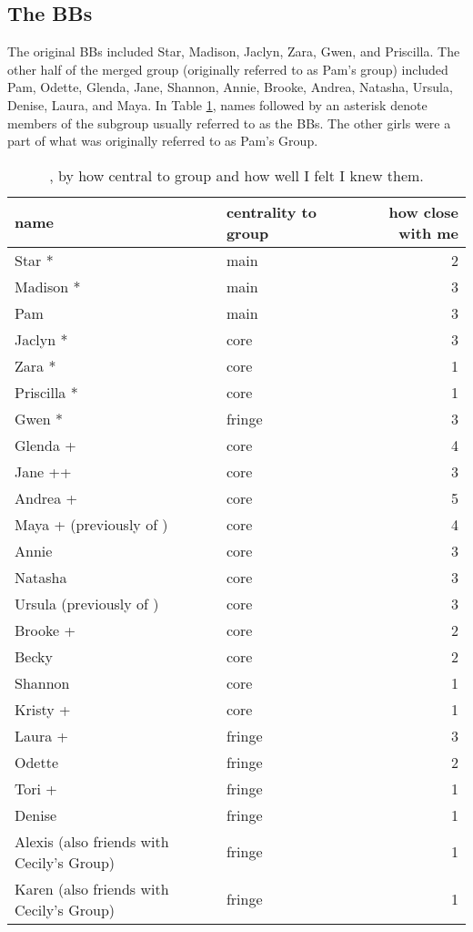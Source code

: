 \subsection {The BBs}
\nopagebreak
The original BBs in\-cluded Star, Ma\-di\-son, Ja\-clyn, Za\-ra, Gwen, and Pris\-cil\-la.  The other half of the merged group (originally referred to as Pam's group) included Pam, Odette, Glenda, Jane, Shannon, Annie, Brooke, Andrea, Natasha, Ursula, Denise, Laura, and Maya.  In Table \ref{BBnames}, names followed by an asterisk denote members of the subgroup usually referred to as the BBs.  The other girls were a part of what was originally referred to as Pam's Group.
\nopagebreak
\begin{table}[ht]
\caption{, by how central to group and how well I felt I knew them.}	\label{BBnames}
	\centering
		\begin{tabular}{llr} \\
		\hline
		
			name & centrality to group & how close with me  \\
			\hline
			
			Star * 		&		main	&		2 \\
			Madison *	&		main	&		3 \\
			Pam			&		main	&		3 \\
			Jaclyn *	&		core	&		3 \\
			Zara *	&		core	&		1 \\
			Priscilla * & core	&		1 \\
			Gwen *		&		fringe &	3 \\
			Glenda +	&		core	&		4 \\
			Jane ++		&		core	&	3 \\
			Andrea + & core & 5 \\
			Maya + (previously of \isi{The PCs}) & core & 4 \\
			Annie & core & 3 \\
			Natasha & core & 3 \\
			Ursula (previously of \isi{The PCs}) & core & 3 \\
			Brooke + & core & 2 \\
			Becky & core & 2 \\
			Shannon	&	core	& 1 \\
			Kristy + & core & 1 \\
			Laura + & fringe & 3 \\
			Odette	&		fringe	&	2 \\
			Tori  +  & fringe  & 1 \\
			Denise & fringe & 1 \\
			Alexis (also friends with Cecily's Group) & fringe & 1 \\
			Karen (also friends with Cecily's Group) & fringe & 1 \\
			   \hline
		\end{tabular}
\end{table}


